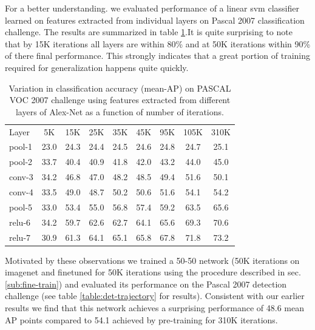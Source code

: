 \documentclass[runningheads]{llncs}
\begin{document}
For a better understanding. we evaluated performance of a linear svm classifier learned on features extracted from individual layers on Pascal 2007 classification challenge. The results are summarized in table \ref{table:det-traj-classify}.It is quite surprising to note that by 15K iterations all layers are within 80\% and at 50K iterations within 90\% of there final performance. This strongly indicates that a great portion of training required for generalization happens quite quickly. 

\setlength{\tabcolsep}{4pt}
\begin{table}[t!]
\begin{center}
\caption{Variation in classification accuracy (mean-AP) on PASCAL VOC 2007 challenge using features extracted from different layers of Alex-Net as a function of number of iterations.}
\label{table:det-traj-classify}
\begin{tabular}{lcccccccc}
\hline\noalign{\smallskip}
Layer  & 5K & 15K & 25K & 35K & 45K & 95K & 105K & 310K \\
\noalign{\smallskip}
\hline
\noalign{\smallskip}
pool-1 & 23.0 & 24.3 & 24.4 & 24.5 & 24.6 & 24.8 & 24.7 & 25.1\\
pool-2 & 33.7 & 40.4 & 40.9 & 41.8 & 42.0 & 43.2 & 44.0 & 45.0\\
conv-3 & 34.2 & 46.8 & 47.0 & 48.2 & 48.5 & 49.4 & 51.6 & 50.1\\
conv-4 & 33.5 & 49.0 & 48.7 & 50.2 & 50.6 & 51.6 & 54.1 & 54.2\\
pool-5 & 33.0 & 53.4 & 55.0 & 56.8 & 57.4 & 59.2 & 63.5 & 65.6\\
relu-6 & 34.2 & 59.7 & 62.6 & 62.7 & 64.1 & 65.6 & 69.3 & 70.6\\
relu-7 & 30.9 & 61.3 & 64.1 & 65.1 & 65.8 & 67.8 & 71.8 & 73.2\\
\hline
\end{tabular}
\end{center}
\end{table}
\setlength{\tabcolsep}{1.4pt}

Motivated by these observations we trained a 50-50 network (50K iterations on imagenet and finetuned for 50K iterations using the procedure described in sec. \ref{sub:fine-train}) and evaluated its performance on the  Pascal 2007 detection challenge (see table \ref{table:det-trajectory} for results). Consistent with our earlier results we find that this network achieves a surprising performance of 48.6 mean AP points compared to 54.1 achieved by pre-training for 310K iterations. 
\end{document}
